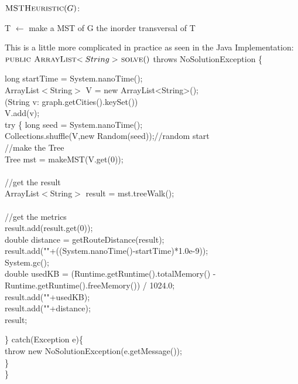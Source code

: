 \documentclass[midd]{thesis}
\newcommand{\tab}{\hspace*{2em}}
\begin{document}
$\textnormal{\scshape MSTHeuristic}(G)$:
\begin{codebox}
\li T $\gets$ make a MST of G
\li \Return the inorder transversal of T
\end{codebox}
This is a little more complicated in practice as seen in the Java Implementation:\\
$\textnormal{\scshape public ArrayList$<String>$ solve}()$ throws NoSolutionException \{
\begin{codebox}
\tab long startTime = System.nanoTime();\\
\tab ArrayList$<$String$>$ V = new ArrayList<String>();\\
\tab \For(String v: graph.getCities().keySet())\\
\tab\tab V.add(v);\End\\
\tab try \{
\tab\tab long seed = System.nanoTime();\\
\tab\tab Collections.shuffle(V,new Random(seed));//random start\\
\tab\tab//make the Tree\\
\tab\tab Tree mst = makeMST(V.get(0));\\\\
\tab\tab//get the result\\
\tab\tab ArrayList$<$String$>$ result = mst.treeWalk();\\\\	
\tab\tab//get the metrics\\
\tab\tab result.add(result.get(0));\\
\tab\tab double distance = getRouteDistance(result);\\
\tab\tab result.add(""+((System.nanoTime()-startTime)*1.0e-9));\\
\tab\tab System.gc();\\
\tab\tab double usedKB = (Runtime.getRuntime().totalMemory() - \\
\tab\tab\tab Runtime.getRuntime().freeMemory()) / 1024.0;\\
\tab\tab result.add(""+usedKB);\\
\tab\tab result.add(""+distance);\\
\tab \Return result;\\
\end{codebox}
\begin{codebox}
\tab\} catch(Exception e)\{\\
\tab\tab throw new NoSolutionException(e.getMessage());\\
\tab\}\\
\}
\end{codebox}
\end{document}
